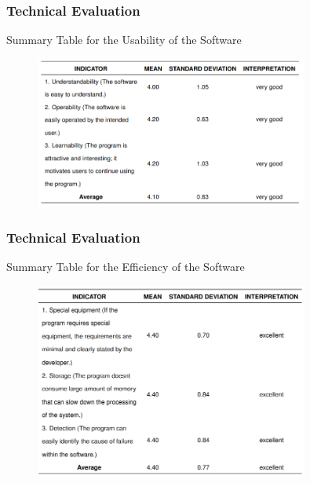 \documentclass{beamer}
\begin{document}
\begin{frame}
	\frametitle{Technical Evaluation}
	\begin{block}{Summary Table for the Usability of the Software}
		\begin{figure}
			\includegraphics[width=0.8\textwidth]{figures/res_tech_usability.png}
		\end{figure}
	\end{block}
\end{frame}

\begin{frame}
	\frametitle{Technical Evaluation}
	\begin{block}{Summary Table for the Efficiency of the Software}
		\begin{figure}
			\includegraphics[width=0.8\textwidth]{figures/res_tech_efficiency.png}
		\end{figure}
	\end{block}
\end{frame}
\end{document}
